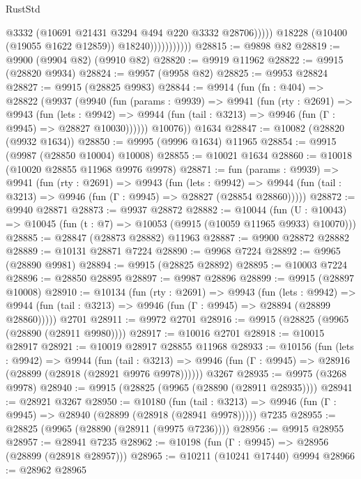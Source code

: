 \begin{lexlean}{RustStd}
\begin{coremodule}
                                  @3332
                                  (@10691 @21431 @3294 @494 @220 @3332 @28706)))))
                          @18228
                          (@10400 (@19055 @1622 @12859))
                          @18240)))))))))))
@28815 := @9898 @82
@28819 := @9900 (@9904 @82) (@9910 @82)
@28820 := @9919 @11962
@28822 := @9915 (@28820 @9934)
@28824 := @9957 (@9958 @82)
@28825 := @9953 @28824
@28827 := @9915 (@28825 @9983)
@28844 := @9914
    (fun (fn : @404) =>
    @28822
      (@9937
        (@9940
          (fun (params : @9939) =>
          @9941
            (fun (rty : @2691) =>
            @9943
              (fun (lets : @9942) =>
              @9944 (fun (tail : @3213) => @9946 (fun (Γ : @9945) => @28827 @10030))))))
        @10076))
    @1634
@28847 := @10082 (@28820 (@9932 @1634))
@28850 := @9995 (@9996 @1634) @11965
@28854 := @9915 (@9987 (@28850 @10004) @10008)
@28855 := @10021 @1634
@28860 := @10018 (@10020 @28855 @11968 @9976 @9978)
@28871 := fun (params : @9939) =>
  @9941
    (fun (rty : @2691) =>
    @9943
      (fun (lets : @9942) =>
      @9944 (fun (tail : @3213) => @9946 (fun (Γ : @9945) => @28827 (@28854 @28860)))))
@28872 := @9940 @28871
@28873 := @9937 @28872
@28882 := @10044
    (fun (U : @10043) => @10045 (fun (t : @7) => @10053 (@9915 (@10059 @11965 @9933) @10070)))
@28885 := @28847 (@28873 @28882) @11963
@28887 := @9900 @28872 @28882
@28889 := @10131 @28871 @7224
@28890 := @9968 @7224
@28892 := @9965 (@28890 @9981)
@28894 := @9915 (@28825 @28892)
@28895 := @10003 @7224
@28896 := @28850 @28895
@28897 := @9987 @28896
@28899 := @9915 (@28897 @10008)
@28910 := @10134
    (fun (rty : @2691) =>
    @9943
      (fun (lets : @9942) =>
      @9944 (fun (tail : @3213) => @9946 (fun (Γ : @9945) => @28894 (@28899 @28860)))))
    @2701
@28911 := @9972 @2701
@28916 := @9915 (@28825 (@9965 (@28890 (@28911 @9980))))
@28917 := @10016 @2701
@28918 := @10015 @28917
@28921 := @10019 @28917 @28855 @11968
@28933 := @10156
    (fun (lets : @9942) =>
    @9944
      (fun (tail : @3213) =>
      @9946 (fun (Γ : @9945) => @28916 (@28899 (@28918 (@28921 @9976 @9978))))))
    @3267
@28935 := @9975 (@3268 @9978)
@28940 := @9915 (@28825 (@9965 (@28890 (@28911 @28935))))
@28941 := @28921 @3267
@28950 := @10180
    (fun (tail : @3213) => @9946 (fun (Γ : @9945) => @28940 (@28899 (@28918 (@28941 @9978)))))
    @7235
@28955 := @28825 (@9965 (@28890 (@28911 (@9975 @7236))))
@28956 := @9915 @28955
@28957 := @28941 @7235
@28962 := @10198 (fun (Γ : @9945) => @28956 (@28899 (@28918 @28957)))
@28965 := @10211 (@10241 @17440) @9994
@28966 := @28962 @28965

\end{coremodule}
\end{lexlean}
